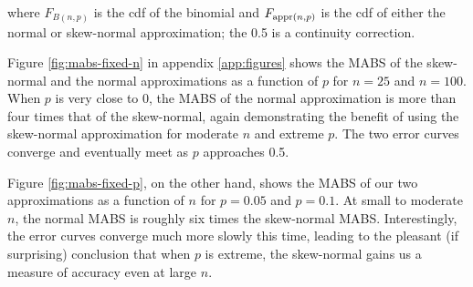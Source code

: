 where $F_{B(n,p)}$ is the cdf of the binomial and $F_{\textnormal{appr}(n,p)}$
is the cdf of either the normal or skew-normal approximation; the 0.5 is a
continuity correction.

Figure \ref{fig:mabs-fixed-n} in appendix \ref{app:figures} shows the MABS of
the skew-normal and the normal approximations as a function of $p$ for $n=25$
and $n=100$. When $p$ is very close to 0, the MABS of the normal approximation
is more than four times that of the skew-normal, again demonstrating the
benefit of using the skew-normal approximation for moderate $n$ and extreme
$p$. The two error curves converge and eventually meet as $p$ approaches 0.5.

Figure \ref{fig:mabs-fixed-p}, on the other hand, shows the MABS of our two
approximations as a function of $n$ for $p=0.05$ and $p=0.1$. At small to
moderate $n$, the normal MABS is roughly six times the skew-normal MABS.
Interestingly, the error curves converge much more slowly this time, leading to
the pleasant (if surprising) conclusion that when $p$ is extreme, the
skew-normal gains us a measure of accuracy even at large $n$.
